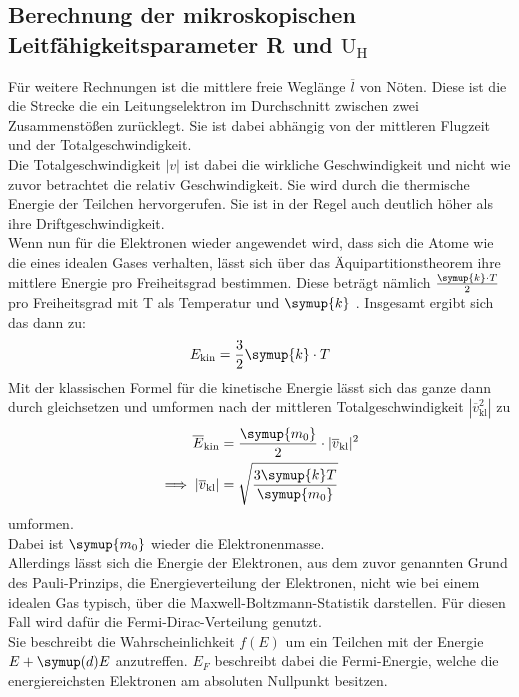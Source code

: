 \subsection{Berechnung der mikroskopischen Leitfähigkeitsparameter R und $\text{U}_\text{H}$} 

Für weitere Rechnungen ist die mittlere freie Weglänge $\overline{l}$ von Nöten.
Diese ist die die Strecke die ein Leitungselektron im Durchschnitt zwischen zwei Zusammenstößen zurücklegt. 
Sie ist dabei abhängig von der mittleren Flugzeit und der Totalgeschwindigkeit.\\
Die Totalgeschwindigkeit $|v|$ ist dabei die wirkliche Geschwindigkeit und nicht wie zuvor betrachtet  die relativ Geschwindigkeit.
Sie wird durch die thermische Energie der Teilchen hervorgerufen. Sie ist in der Regel auch deutlich höher als ihre Driftgeschwindigkeit.\\
Wenn nun für die Elektronen wieder angewendet wird, dass sich die Atome wie die eines idealen Gases verhalten, lässt sich über das Äquipartitionstheorem
ihre mittlere Energie pro Freiheitsgrad bestimmen. Diese beträgt nämlich $\frac{\symup{k}\cdot T}{2}$ pro Freiheitsgrad mit T als Temperatur und 
$\symup{k}$ \cite{Boltzmann}. Insgesamt ergibt sich das dann zu:
\begin{equation}
  E_\text{kin}=\frac{3}{2}\symup{k}\cdot T \nonumber
\end{equation}
Mit der klassischen Formel für die kinetische Energie lässt sich das ganze dann
durch gleichsetzen und umformen nach der mittleren Totalgeschwindigkeit $|\overline{v}_\text{kl}^2|$ zu
\begin{align}
  \overline{E}_\text{kin} &=\frac{\symup{m_0}}{2} \cdot |\overline{v}_\text{kl}|^2  \label{eqn:energ}\\
  \implies |\overline{v}_\text{kl}| &=\sqrt{\frac{3\symup{k}T}{\symup{m_0}}} \label{eqn:vtot}
\end{align}
umformen.\\
Dabei ist $\symup{m_0}$ wieder die Elektronenmasse.\\
Allerdings lässt sich die Energie der Elektronen, aus dem zuvor genannten Grund des Pauli-Prinzips,
die Energieverteilung der Elektronen, nicht wie bei einem idealen Gas typisch, über die Maxwell-Boltzmann-Statistik darstellen.
Für diesen Fall wird dafür die Fermi-Dirac-Verteilung genutzt.\\
Sie beschreibt die Wahrscheinlichkeit $f(E)$ um ein Teilchen mit der Energie $E + \symup(d)E$ anzutreffen.
$E_F$ beschreibt dabei die Fermi-Energie, welche die energiereichsten Elektronen am absoluten Nullpunkt besitzen.

